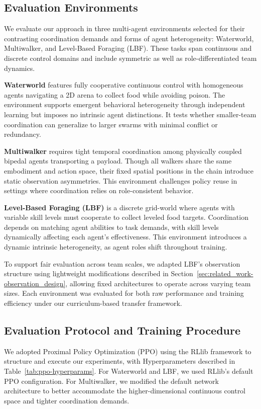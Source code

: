 \documentclass{article}
\begin{document}
\subsection{Evaluation Environments} 

We evaluate our approach in three multi-agent environments selected for their contrasting 
coordination demands and forms of agent heterogeneity: 
Waterworld, Multiwalker, and Level-Based Foraging (LBF). These tasks span continuous 
and discrete control domains and include symmetric as well as role-differentiated team dynamics.

\textbf{Waterworld} features fully cooperative continuous control with homogeneous agents 
navigating a 2D arena to collect food while avoiding poison. The environment supports emergent 
behavioral heterogeneity through independent learning but imposes no intrinsic agent distinctions. 
It tests whether smaller-team coordination can generalize to larger swarms with minimal 
conflict or redundancy.

\textbf{Multiwalker} requires tight temporal coordination among physically coupled bipedal agents 
transporting a payload. Though all walkers share the same embodiment and action space, 
their fixed spatial positions in the chain introduce static observation asymmetries. 
This environment challenges policy reuse in settings where coordination relies on 
role-consistent behavior.

\textbf{Level-Based Foraging (LBF)} is a discrete grid-world where agents with variable skill 
levels must cooperate to collect leveled food targets. Coordination depends on matching agent 
abilities to task demands, with skill levels dynamically affecting each agent's effectiveness. 
This environment introduces a dynamic intrinsic heterogeneity, as agent roles shift throughout 
training.

To support fair evaluation across team scales, we adapted LBF's observation structure using 
lightweight modifications described in Section~\ref{sec:related_work-observation_design}, 
allowing fixed 
architectures to operate across varying team sizes. Each environment was evaluated for both 
raw performance and training efficiency under our curriculum-based transfer framework.

\subsection{Evaluation Protocol and Training Procedure}

We adopted Proximal Policy Optimization (PPO)\cite{schulman2017} using the RLlib 
framework to structure and execute our experiments, with Hyperparameters described in
Table~\ref{tab:ppo-hyperparams}. For Waterworld and LBF, 
we used RLlib's default PPO configuration. For Multiwalker, we modified the default 
network architecture to better accommodate the higher-dimensional continuous control space and 
tighter coordination demands.
\end{document}
